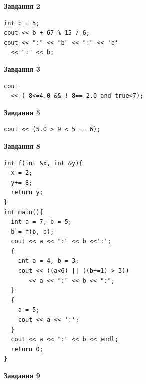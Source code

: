 \documentclass[12pt, ukrainian]{article}
\begin{document}
{\begin {large}
\begin{minipage}[t]{7.0cm}
\end{minipage}
\vline \hspace{1mm}
\begin{minipage}[t]{11.0cm}

\begin{center}
\textbf{Завдання 2}
\end{center}
\vspace{-8mm}

\begin{verbatim}
int b = 5;
cout << b + 67 % 15 / 6;
cout << ":" << "b" << ":" << 'b' 
  << ":" << b;
\end{verbatim}



\begin{center}
\textbf{Завдання 3}
\end{center}
\vspace{-8mm}

\begin{verbatim}
cout 
  << ( 8<=4.0 && ! 8== 2.0 and true<7);
\end{verbatim}



\begin{center}
\textbf{Завдання 5}
\end{center}
\vspace{-8mm}

\begin{verbatim}
cout << (5.0 > 9 < 5 == 6);
\end{verbatim}



\begin{center}
\textbf{Завдання 8}
\end{center}
\vspace{-8mm}

\begin{verbatim}
int f(int &x, int &y){
  x = 2;
  y+= 8;
  return y;
}
int main(){
  int a = 7, b = 5;
  b = f(b, b);
  cout << a << ":" << b <<':';
  {
    int a = 4, b = 3;
    cout << ((a<6) || ((b+=1) > 3))
       << a << ":" << b << ":";
  }
  {
    a = 5;
    cout << a << ':';
  }
  cout << a << ":" << b << endl;
  return 0;
}
\end{verbatim}

\end{minipage}


\begin{minipage}[t]{7.0cm}

\begin{center}
\textbf{Завдання 9}
\end{center}
\vspace{-8mm}


\end{minipage}
\end{large}}
\end{document}
